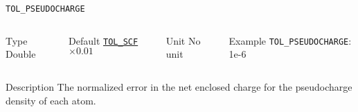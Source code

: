 \documentclass[xcolor=dvipsnames,t]{beamer}
\begin{document}
\begin{frame}[allowframebreaks]{\texttt{TOL\_PSEUDOCHARGE}} \label{TOL_PSEUDOCHARGE}
\vspace*{-12pt}
\begin{columns}
\begin{block}{Type}
Double
\end{block}

\begin{block}{Default}
\hyperlink{TOL_SCF}{\texttt{TOL\_SCF}}$\times 0.01$
\end{block}

\begin{block}{Unit}
No unit
\end{block}

\begin{block}{Example}
\texttt{TOL\_PSEUDOCHARGE}: 1e-6
\end{block}
\end{columns}

\begin{block}{Description}
The normalized error in the net enclosed charge for the pseudocharge density of each atom.
\end{block}

\end{frame}
\end{document}
